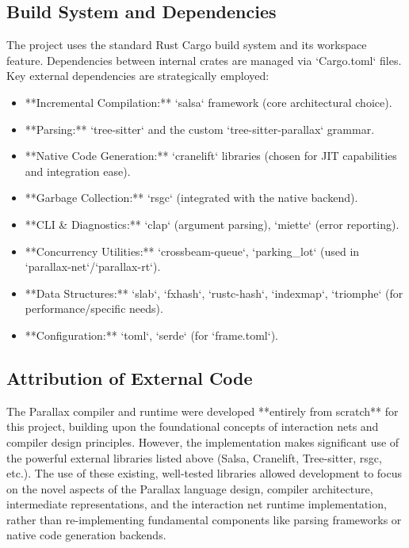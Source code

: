 \subsection{Build System and Dependencies} %
The project uses the standard Rust Cargo build system and its workspace feature. Dependencies between internal crates are managed via `Cargo.toml` files. Key external dependencies are strategically employed:
\begin{itemize}
    \item **Incremental Compilation:** `salsa` framework (core architectural choice).
    \item **Parsing:** `tree-sitter` and the custom `tree-sitter-parallax` grammar.
    \item **Native Code Generation:** `cranelift` libraries (chosen for JIT capabilities and integration ease).
    \item **Garbage Collection:** `rsgc` (integrated with the native backend).
    \item **CLI & Diagnostics:** `clap` (argument parsing), `miette` (error reporting).
    \item **Concurrency Utilities:** `crossbeam-queue`, `parking_lot` (used in `parallax-net`/`parallax-rt`).
    \item **Data Structures:** `slab`, `fxhash`, `rustc-hash`, `indexmap`, `triomphe` (for performance/specific needs).
    \item **Configuration:** `toml`, `serde` (for `frame.toml`).
\end{itemize}

\subsection{Attribution of External Code} %
The Parallax compiler and runtime were developed **entirely from scratch** for this project, building upon the foundational concepts of interaction nets and compiler design principles. However, the implementation makes significant use of the powerful external libraries listed above (Salsa, Cranelift, Tree-sitter, rsgc, etc.). The use of these existing, well-tested libraries allowed development to focus on the novel aspects of the Parallax language design, compiler architecture, intermediate representations, and the interaction net runtime implementation, rather than re-implementing fundamental components like parsing frameworks or native code generation backends.

